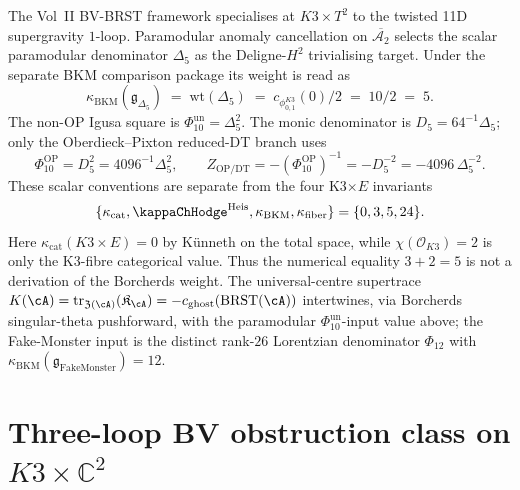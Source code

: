 \begin{remark}
\label{rem:vol2-bvbrst-paramodular}
The Vol~II BV-BRST framework specialises at $K3 \times T^2$ to the
twisted 11D supergravity $1$-loop. Paramodular anomaly cancellation on
$\overline{\mathcal{A}_2}$ selects the scalar paramodular denominator
$\Delta_5$ as the Deligne-$H^2$ trivialising target. Under the separate
BKM comparison package its weight is read as
\[
 \kappa_{\mathrm{BKM}}(\mathfrak g_{\Delta_5})
 \;=\;
 \mathrm{wt}(\Delta_5)
 \;=\;
 c_{\phi_{0,1}^{K3}}(0)/2
 \;=\;
 10/2
 \;=\;
 5 .
\]
The non-OP Igusa square is
\(\Phi_{10}^{\mathrm{un}}=\Delta_5^2\).  The monic denominator is
\(D_5=64^{-1}\Delta_5\); only the Oberdieck--Pixton reduced-DT branch
uses
\[
 \Phi_{10}^{\mathrm{OP}}=D_5^2=4096^{-1}\Delta_5^2,\qquad
 Z_{\mathrm{OP/DT}}=-(\Phi_{10}^{\mathrm{OP}})^{-1}
 =-D_5^{-2}=-4096\,\Delta_5^{-2}.
\]
These scalar conventions are separate from the four K3$\times E$
invariants
\[
 \{\kappa_{\mathrm{cat}},\kappaChHodge^{\mathrm{Heis}},
 \kappa_{\mathrm{BKM}},\kappa_{\mathrm{fiber}}\}
 =
 \{0,3,5,24\}.
\]
Here \(\kappa_{\mathrm{cat}}(K3\times E)=0\) by K\"unneth on the total
space, while \(\chi(\mathcal O_{K3})=2\) is only the K3-fibre
categorical value.  Thus the numerical equality \(3+2=5\) is not a
derivation of the Borcherds weight.  The universal-centre supertrace
\(K(\cA)=\mathrm{tr}_{\mathfrak Z(\cA)}(\mathfrak K_\cA)
=-c_{\mathrm{ghost}}(\mathrm{BRST}(\cA))\) intertwines, via
Borcherds singular-theta pushforward, with the paramodular
\(\Phi_{10}^{\mathrm{un}}\)-input value above; the Fake-Monster input is
the distinct rank-$26$ Lorentzian denominator \(\Phi_{12}\) with
\(\kappa_{\mathrm{BKM}}(\mathfrak g_{\mathrm{FakeMonster}})=12\).
\end{remark}

\section{Three-loop BV obstruction class on $K3\times\mathbb{C}^2$}
\label{sec:vol2-bvbrst-3loop-obstruction}

